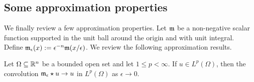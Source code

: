 \documentclass[10pt,letterpaper]{article}
\begin{document}
\subsection{Some approximation properties}

We finally review a few approximation properties. 
Let ${\mathfrak m}$ be a non-negative scalar function supported in the unit ball around the origin and with unit integral.
Define ${\mathfrak m}_{\epsilon}(x) := \epsilon^{-n} {\mathfrak m}(x/\epsilon)$. We review the following approximation results.

\begin{lemma}
    Let $\Omega \subseteq {\mathbb R}^{n}$ be a bounded open set and let $1 \leq p < \infty$. 
    If $u \in L^{p}(\Omega)$, then the convolution ${\mathfrak m}_{\epsilon} \star u \rightarrow u$ in $L^{p}(\Omega)$ as $\epsilon \rightarrow 0$.
\end{lemma}

\end{document}
